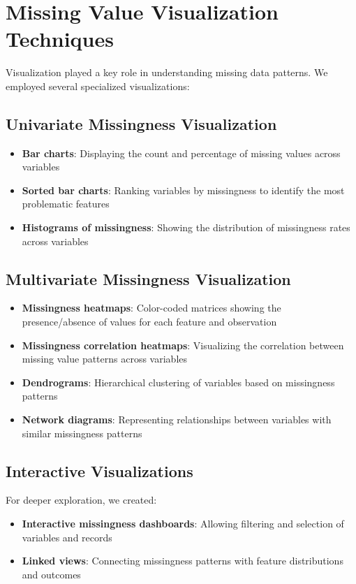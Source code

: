 \section{Missing Value Visualization Techniques}
\label{sec:missing_viz}

Visualization played a key role in understanding missing data patterns. We employed several specialized visualizations:

\subsection{Univariate Missingness Visualization}
\begin{itemize}
    \item \textbf{Bar charts}: Displaying the count and percentage of missing values across variables
    \item \textbf{Sorted bar charts}: Ranking variables by missingness to identify the most problematic features
    \item \textbf{Histograms of missingness}: Showing the distribution of missingness rates across variables
\end{itemize}

\subsection{Multivariate Missingness Visualization}
\begin{itemize}
    \item \textbf{Missingness heatmaps}: Color-coded matrices showing the presence/absence of values for each feature and observation
    \item \textbf{Missingness correlation heatmaps}: Visualizing the correlation between missing value patterns across variables
    \item \textbf{Dendrograms}: Hierarchical clustering of variables based on missingness patterns
    \item \textbf{Network diagrams}: Representing relationships between variables with similar missingness patterns
\end{itemize}

\subsection{Interactive Visualizations}
For deeper exploration, we created:
\begin{itemize}
    \item \textbf{Interactive missingness dashboards}: Allowing filtering and selection of variables and records
    \item \textbf{Linked views}: Connecting missingness patterns with feature distributions and outcomes
\end{itemize}

